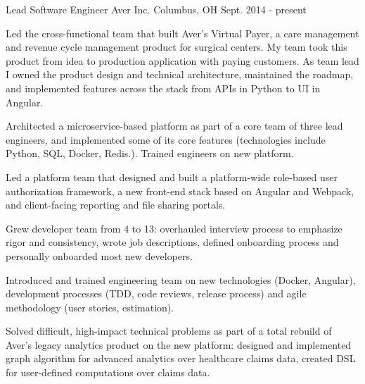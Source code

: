 

\begin{cventries}

  \cventry
    {Lead Software Engineer} %
    {Aver Inc.} %
    {Columbus, OH} %
    {Sept. 2014 - present} %
    {
      \begin{cvitems} %
        \item {Led the cross-functional team that built Aver's Virtual Payer, a care management and revenue cycle management product for surgical centers.
        My team took this product from idea to production application with paying customers.
        As team lead I owned the product design and technical architecture, maintained the roadmap, and implemented features across the stack from APIs in Python to UI in Angular.}
        \item {Architected a microservice-based platform as part of a core team of three lead engineers, and implemented some of its core features (technologies include Python, SQL, Docker, Redis.).
        Trained engineers on new platform.}
        \item {Led a platform team that designed and built a platform-wide role-based user authorization framework, a new front-end stack based on Angular and Webpack, and client-facing reporting and file sharing portals.}
        \item {Grew developer team from 4 to 13: overhauled interview process to emphasize rigor and consistency, wrote job descriptions, defined onboarding process and personally onboarded most new developers.}
        \item {Introduced and trained engineering team on new technologies (Docker, Angular), development processes (TDD, code reviews, release process) and agile methodology (user stories, estimation).}
        \item {Solved difficult, high-impact technical problems as part of a total rebuild of Aver's legacy analytics product on the new platform: designed and implemented graph algorithm for advanced analytics over healthcare claims data, created DSL for user-defined computations over claims data.}
      \end{cvitems}
    }


\end{cventries}
